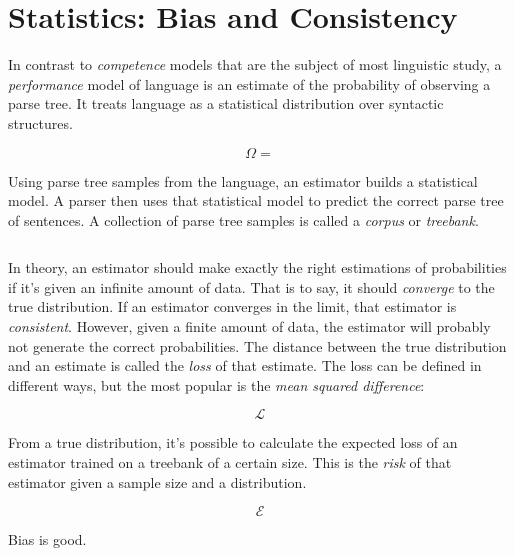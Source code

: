 \section{Statistics: Bias and Consistency}



In contrast to \emph{competence} models that are the subject of most linguistic study, a \emph{performance} model of language is an estimate of the probability of observing a parse tree. It treats language as a statistical distribution over syntactic structures.

$$\Omega = $$

Using parse tree samples from the language, an estimator builds a statistical model. A parser then uses that statistical model to predict the correct parse tree of sentences.
A collection of parse tree samples is called a \emph{corpus} or \emph{treebank}.

$$  $$

In theory, an estimator should make exactly the right estimations of probabilities if it's given an infinite amount of data. That is to say, it should \emph{converge} to the true distribution. If an estimator converges in the limit, that estimator is \emph{consistent}.
However, given a finite amount of data, the estimator will probably not generate the correct probabilities. The distance between the true distribution and an estimate is called the \emph{loss} of that estimate. The loss can be defined in different ways, but the most popular is the \emph{mean squared difference}:

$$ \mathcal{L} $$

From a true distribution, it's possible to calculate the expected loss of an estimator trained on a treebank of a certain size. This is the \emph{risk} of that estimator given a sample size and a distribution.

$$ \mathcal{E} $$










Bias is good.
